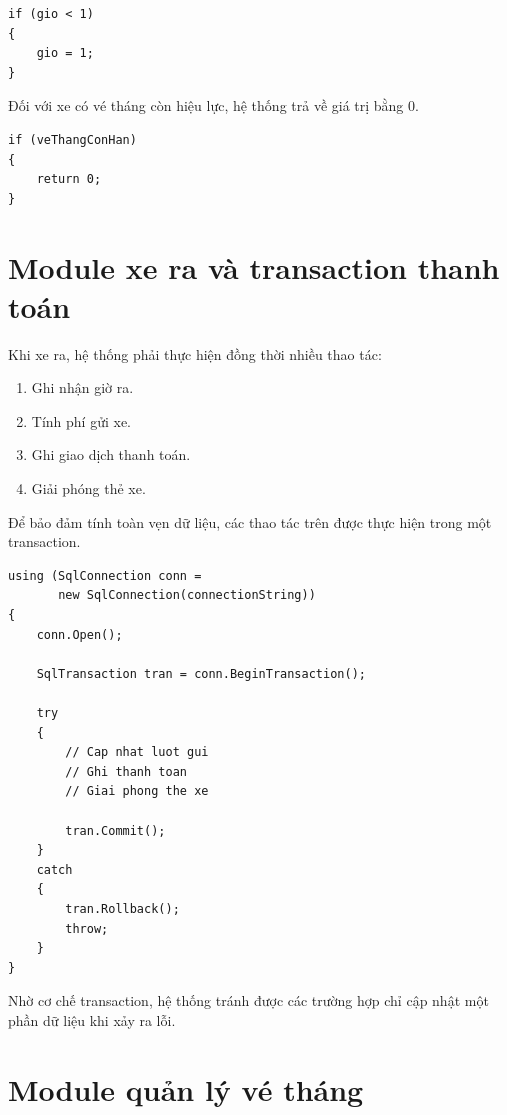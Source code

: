 \begin{lstlisting}
if (gio < 1)
{
    gio = 1;
}
\end{lstlisting}

Đối với xe có vé tháng còn hiệu lực, hệ thống trả về giá trị bằng 0.

\begin{lstlisting}
if (veThangConHan)
{
    return 0;
}
\end{lstlisting}

\section{Module xe ra và transaction thanh toán}

Khi xe ra, hệ thống phải thực hiện đồng thời nhiều thao tác:

\begin{enumerate}
    \item Ghi nhận giờ ra.
    \item Tính phí gửi xe.
    \item Ghi giao dịch thanh toán.
    \item Giải phóng thẻ xe.
\end{enumerate}

Để bảo đảm tính toàn vẹn dữ liệu, các thao tác trên được thực hiện
trong một transaction.

\begin{lstlisting}
using (SqlConnection conn =
       new SqlConnection(connectionString))
{
    conn.Open();

    SqlTransaction tran = conn.BeginTransaction();

    try
    {
        // Cap nhat luot gui
        // Ghi thanh toan
        // Giai phong the xe

        tran.Commit();
    }
    catch
    {
        tran.Rollback();
        throw;
    }
}
\end{lstlisting}

Nhờ cơ chế transaction, hệ thống tránh được các trường hợp chỉ
cập nhật một phần dữ liệu khi xảy ra lỗi.

\section{Module quản lý vé tháng}

